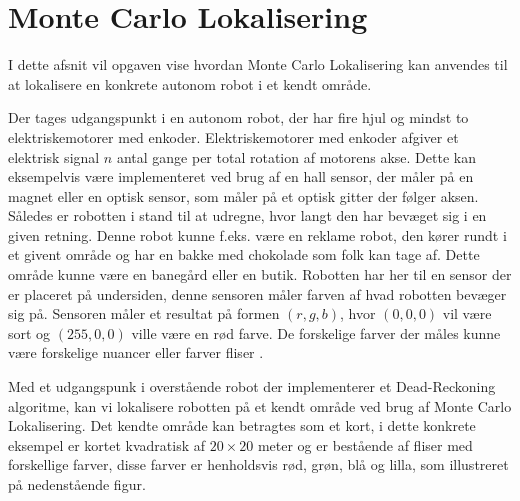 \documentclass[../../SRP.tex]{subfiles}
\begin{document}
\chapter{Monte Carlo Lokalisering}
I dette afsnit vil opgaven vise hvordan Monte Carlo Lokalisering kan anvendes til at lokalisere en konkrete autonom robot i et kendt område.

 Der tages udgangspunkt i en autonom robot, der har fire hjul og mindst to elektriskemotorer med enkoder. Elektriskemotorer med enkoder afgiver et elektrisk signal $n$ antal gange per total rotation af motorens akse. Dette kan eksempelvis være implementeret ved brug af en hall sensor, der måler på en magnet eller en optisk sensor, som måler på et optisk gitter der følger aksen. Således er robotten i stand til at udregne, hvor langt den har bevæget sig i en given retning. Denne robot kunne f.eks. være en reklame robot, den kører rundt i et givent område og har en bakke med chokolade som folk kan tage af. Dette område kunne være en banegård eller en butik. Robotten har her til en sensor der er placeret på undersiden, denne sensoren måler farven af hvad robotten bevæger sig på. Sensoren måler et resultat på formen $(r,g,b)$, hvor $(0,0,0)$ vil være sort og $(255,0,0)$ ville være en rød farve. De forskelige farver der måles kunne være forskelige nuancer eller farver fliser \cite{DR}.

Med et udgangspunk i overstående robot der implementerer et Dead-Reckoning algoritme, kan vi lokalisere robotten på et kendt område ved brug af Monte Carlo Lokalisering. Det kendte område kan betragtes som et kort, i dette konkrete eksempel er kortet kvadratisk af $20 \times 20$ meter og er bestående af fliser med forskellige farver, disse farver er henholdsvis rød, grøn, blå og lilla, som illustreret på nedenstående figur.


\begin{center}
\end{center}
\end{document}
